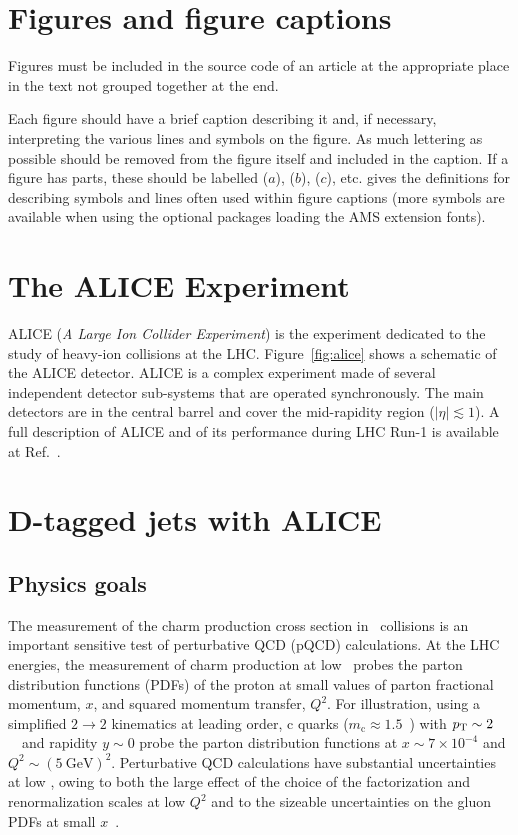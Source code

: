 \documentclass[a4paper]{jpconf}
\begin{document}
\section{Figures and figure captions}
Figures must be included in the source code of an article at the appropriate place in the text not grouped together at the end. 

Each figure should have a brief caption describing it and, if 
necessary, interpreting the various lines and symbols on the figure. 
As much lettering as possible should be removed from the figure itself and 
included in the caption. If a figure has parts, these should be 
labelled ($a$), ($b$), ($c$), etc. 
 gives the definitions for describing symbols and lines often
used within figure captions (more symbols are available
when using the optional packages loading the AMS extension fonts).

\section{The ALICE Experiment}
ALICE (\emph{A Large Ion Collider Experiment}) is the experiment dedicated to the study of heavy-ion collisions at the LHC.
Figure~\ref{fig:alice} shows a schematic of the ALICE detector.
ALICE is a complex experiment made of several independent detector sub-systems that are operated synchronously.
The main detectors are in the central barrel and cover the mid-rapidity region ($\lvert \eta\rvert \lesssim 1$).
A full description of ALICE and of its performance during LHC Run-1 is available at Ref.~\cite{ALICE:2014b}.\


\section{D-tagged jets with ALICE}
\subsection{Physics goals}
The measurement of the charm production cross section in \pp\ collisions is an important sensitive test of perturbative QCD (pQCD) calculations.
At the LHC energies, the measurement of charm production at low \pT\ probes the parton distribution functions (PDFs)
of the proton at small values of parton fractional momentum, $x$, and squared momentum transfer, $Q^2$.
For illustration, using a simplified $2 \rightarrow 2$ kinematics at leading order, c quarks ($m_{\mathrm{c}} \approx 1.5$~\GeVcsq) with
$p_{\rm T} \sim 2$~\GeVc\ and rapidity $y \sim 0$ probe the parton distribution functions at $x \sim 7 \times 10^{-4}$ and
$Q^2 \sim (5~\mathrm{GeV})^2$.
Perturbative QCD calculations have substantial uncertainties at low \pT, owing to both the large effect of the
choice of the factorization and renormalization scales at low $Q^2$ and to the sizeable uncertainties on the
gluon PDFs at small $x$~\cite{Cacciari:2015}. 
\end{document}
